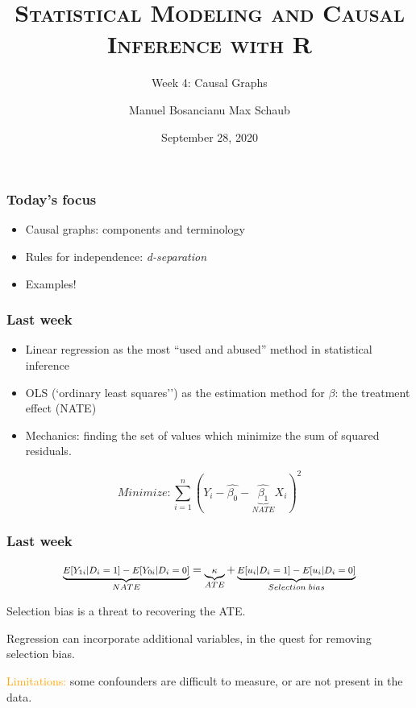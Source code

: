 \documentclass[12pt,english,dvipsnames,aspectratio=169,handout]{beamer}
\title{\textsc{Statistical Modeling and Causal Inference with R}}
\subtitle{Week 4: Causal Graphs}
\date{September 28, 2020}
\author{Manuel Bosancianu \hfill Max Schaub}
\institute{Hertie School}
\begin{document}
\maketitle

\begin{frame}
	\frametitle{Today's focus}
	
	\begin{itemize}
		\setlength\itemsep{1.5em}
		\item Causal graphs: components and terminology\bigskip
		\item Rules for independence: \textit{d-separation}\bigskip
		\item Examples!
	\end{itemize}
\end{frame}


\begin{frame}
	\frametitle{Last week}
	
	\begin{itemize}
		\item Linear regression as the most ``used and abused'' method in statistical inference
		\pause
		\item OLS (`ordinary least squares'') as the estimation method for $\beta$: the treatment effect (NATE)
		\pause
		\item Mechanics: finding the set of values which minimize the sum of squared residuals. 
	\end{itemize}

\begin{equation}
	Minimize: \sum_{i=1}^{n}(Y_i - \hat{\beta_0} - \underbrace{\hat{\beta_1}}_{NATE}X_i)^2
	\label{eq:01}
\end{equation}

\end{frame}


\begin{frame}
	\frametitle{Last week}
	
	\begin{equation}
		\footnotesize
		\underbrace{E[Y_{1i}|D_i = 1] - E[Y_{0i}|D_i = 0]}_{NATE} = \underbrace{\kappa}_{ATE} + \underbrace{E[u_i|D_i = 1] - E[u_i|D_i = 0]}_{Selection\; bias}
		\label{eq:02}
	\end{equation}

	Selection bias is a threat to recovering the ATE.
	
	\pause
	
	Regression can incorporate additional variables, in the quest for removing selection bias.
	
	\pause
	
	\textcolor{orange}{Limitations:} some confounders are difficult to measure, or are not present in the data.
	
\end{frame}
\end{document}
